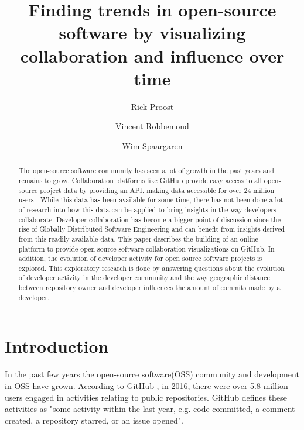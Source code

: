 \documentclass[acmtog, authorversion]{acmart}
\begin{document}
\title{Finding trends in open-source software by visualizing collaboration and influence over time}

\author{Rick Proost}

\author{Vincent Robbemond}

\author{Wim Spaargaren}

\begin{abstract}
The open-source software community has seen a lot of growth in the past years and remains to grow.
Collaboration platforms like GitHub provide easy access to all open-source project data by providing an API, making data accessible for over 24 million users  \cite{GHOctoverse} .
While this data has been available for some time, there has not been done a lot of research into how this data can be applied to bring insights in the way developers collaborate.
Developer collaboration has become a bigger point of discussion since the rise of Globally Distributed Software Engineering and can benefit from insights derived from this readily available data.
This paper describes the building of an online platform to provide open source software collaboration visualizations on GitHub.
In addition, the evolution of developer activity for open source software projects  is explored.
This exploratory research is done by answering questions about the evolution of developer activity in the developer community and the way geographic distance between repository owner and developer influences the amount of commits made by a developer.
\end{abstract}


\maketitle

\section{Introduction}
In the past few years the open-source software(OSS) community and development in OSS have grown.
According to GitHub \cite{GHOctoverse}, in 2016, there were over 5.8 million users engaged in activities relating to public repositories.
GitHub defines these activities as "some activity within the last year, e.g. code committed, a comment created, a repository starred, or an issue opened".
\end{document}
